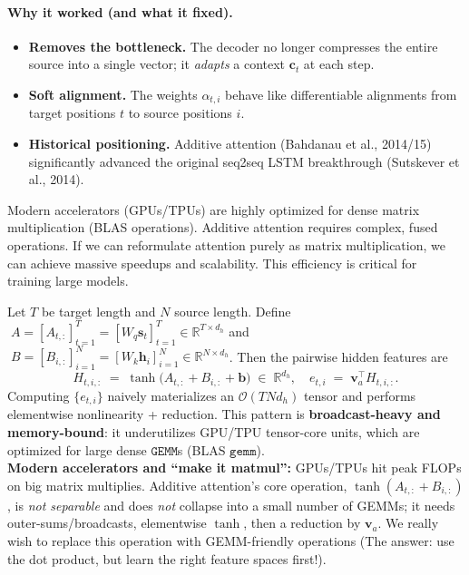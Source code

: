 \documentclass{article}
\begin{document}
\paragraph{Why it worked (and what it fixed).}
\begin{itemize}
  \item \textbf{Removes the bottleneck.} The decoder no longer compresses the entire source into a single vector; it \emph{adapts} a context \(\bm{c}_t\) at each step.
  \item \textbf{Soft alignment.} The weights \(\alpha_{t,i}\) behave like differentiable alignments from target positions \(t\) to source positions \(i\).
  \item \textbf{Historical positioning.} Additive attention (Bahdanau et al., 2014/15) significantly advanced the original seq2seq LSTM breakthrough (Sutskever et al., 2014).
\end{itemize}



\begin{tcolorbox}[colback=yellow!5!white, colframe=orange!50!black, title=The Hardware Insight: Vectorized view and computational footprint]
Modern accelerators (GPUs/TPUs) are highly optimized for dense matrix multiplication (BLAS operations). Additive attention requires complex, fused operations. If we can reformulate attention purely as matrix multiplication, we can achieve massive speedups and scalability. This efficiency is critical for training large models.

Let \(T\) be target length and \(N\) source length. Define
\(\;A = [A_{t,:}]_{t=1}^T = [W_q\bm{s}_t]_{t=1}^T \in \mathbb{R}^{T\times d_h}\)
and
\(\;B = [B_{i,:}]_{i=1}^N = [W_k\bm{h}_i]_{i=1}^N \in \mathbb{R}^{N\times d_h}\).
Then the pairwise hidden features are
\[
H_{t,i,:} \;=\; \tanh\!\big(A_{t,:} + B_{i,:} + \bm{b}\big)\;\in\;\mathbb{R}^{d_h},
\quad
e_{t,i} \;=\; \bm{v}_a^{\!\top} H_{t,i,:}.
\]
Computing \(\{e_{t,i}\}\) naively materializes an \(\mathcal{O}(TN d_h)\) tensor and performs elementwise nonlinearity + reduction. This pattern is \textbf{broadcast-heavy and memory-bound}: it underutilizes GPU/TPU tensor-core units, which are optimized for large dense \(\texttt{GEMM}\)s (BLAS \(\mathtt{gemm}\)).\\
\textbf{Modern accelerators and ``make it matmul'':}
GPUs/TPUs hit peak FLOPs on big matrix multiplies. Additive attention’s core operation,
\(\tanh(A_{t,:}+B_{i,:})\),
is \emph{not separable} and does \emph{not} collapse into a small number of GEMMs; it needs outer-sums/broadcasts, elementwise \(\tanh\), then a reduction by \(\bm{v}_a\).
We really wish to replace this operation with GEMM-friendly operations (The answer: use the dot product, but learn the right feature spaces first!).
\end{tcolorbox}
\end{document}
